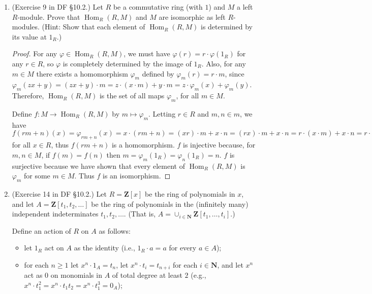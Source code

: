 \documentclass[10pt]{article}
\DeclareMathOperator*{\Hom}{Hom}
\begin{document}
\begin{enumerate}
\item (Exercise 9 in DF \S 10.2.) Let $R$ be a commutative ring (with $1$) and $M$ a left $R$-module.  Prove that $\Hom_R(R,M)$ and $M$ are isomorphic as left $R$-modules.  (Hint: Show that each element of $\Hom_R(R,M)$ is determined by its value at $1_R$.)

\begin{proof}
For any $\varphi \in \Hom_R (R,M)$, we must have $\varphi(r) = r\cdot \varphi(1_R)$ for any $r \in R$, so $\varphi$ is completely determined by the image of $1_R$.  Also, for any $m \in M$ there exists a homomorphism $\varphi_m$ defined by $\varphi_m(r) = r\cdot m$, since $\varphi_m(zx+y) = (zx+y) \cdot m = z\cdot (x\cdot m) + y \cdot m = z \cdot \varphi_m(x) + \varphi_m(y)$.  Therefore, $\Hom_R(R,M)$ is the set of all maps $\varphi_m$, for all $m \in M$.

Define $f: M \rightarrow \Hom_R(R,M)$ by $m \mapsto \varphi_m$.  Letting $r \in R$ and $m,n \in m$, we have $f(rm+n)(x) = \varphi_{rm+n}(x) = x\cdot(rm+n) = (xr)\cdot m + x \cdot n = (rx) \cdot m + x \cdot n = r \cdot (x\cdot m) + x \cdot n = r \cdot \varphi_m (x) + \varphi_n (x) = r \cdot f(m)(x) + f(n)(x)$ for all $x \in R$, thus $f(rm + n)$ is a homomorphism.  $f$ is injective because, for $m, n \in M$, if $f(m) = f(n)$ then $m = \varphi_m(1_R) = \varphi_n(1_R) = n$.  $f$ is surjective because we have shown that every element of $\Hom_R(R,M)$ is $\varphi_m$ for some $m \in M$.  Thus $f$ is an isomorphism.
\end{proof}

\item (Exercise 14 in DF \S 10.2.) Let $R = \mathbf{Z}[x]$ be the ring of polynomials in $x$, and let $A = \mathbf{Z}[t_1,t_2,\ldots]$ be the ring of polynomials in the (infinitely many) independent indeterminates $t_1,t_2,\ldots$.  (That is, $A = \cup_{i \in \mathbf{N}} \mathbf{Z}[t_1,\ldots,t_i]$.)

Define an action of $R$ on $A$ as follows:

\begin{itemize}
\item[(1)] let $1_R$ act on $A$ as the identity (i.e., $1_R \cdot a = a$ for every $a \in A$);

\item[(2)] for each $n \geq 1$ let $x^n \cdot 1_A = t_n$, let $x^n \cdot t_i = t_{n+i}$ for each $i \in \mathbf{N}$, and let $x^n$ act as $0$ on monomials in $A$ of total degree at least $2$ (e.g., $x^n \cdot t_1^2 = x^n \cdot t_1 t_2 = x^n \cdot t_1^3 = 0_A$);


\end{itemize}
\end{enumerate}
\end{document}
